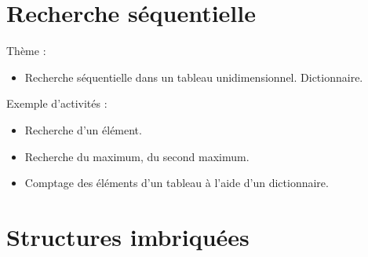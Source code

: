 \proffalse


\section*{Recherche séquentielle}
Thème : 
\begin{itemize}
\item Recherche séquentielle dans un tableau unidimensionnel. Dictionnaire.
\end{itemize}
Exemple d'activités :
\begin{itemize}
\item Recherche d'un élément. 
\item Recherche du maximum, du second maximum. 
\item Comptage des éléments d'un tableau à l'aide d'un dictionnaire.
\end{itemize}

\renewcommand{\repExo}{../../Informatique/S1_Themes/01_RechercheSequentielle}

\renewcommand{\td}{01_AlgorithmesBasiques}
\graphicspath{{\repStyle/png/}{\repExo/\td/images/}}


\renewcommand{\td}{02_Dictionnaires}
\graphicspath{{\repStyle/png/}{\repExo/\td/images/}}


\renewcommand{\td}{03_SuiteSyracuse}
\graphicspath{{\repStyle/png/}{\repExo/\td/images/}}


\newpage

\section*{Structures imbriquées}
\renewcommand{\repExo}{../../Informatique/S1_Themes/02_StructuresImbriquees}

\renewcommand{\td}{05_RechercheDansTableau}
\graphicspath{{\repStyle/png/}{\repExo/\td/images/}}


\renewcommand{\td}{06_RechercheMotDansTexte}
\graphicspath{{\repStyle/png/}{\repExo/\td/images/}}


\renewcommand{\td}{07_TriBulles}
\graphicspath{{\repStyle/png/}{\repExo/\td/images/}}



